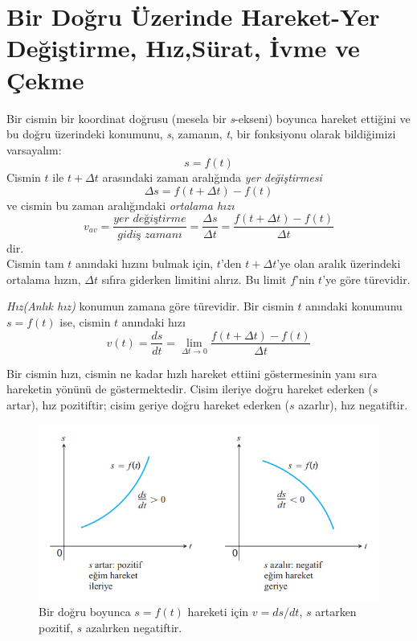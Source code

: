 \section{\protect Bir Doğru Üzerinde Hareket-Yer Değiştirme, Hız,Sürat, İvme ve Çekme} \label{bolumetiketi}
Bir cismin bir koordinat doğrusu (mesela bir \textit{s}-ekseni) boyunca hareket ettiğini ve bu doğru üzerindeki konumunu, \textit{s}, zamanın, \textit{t}, bir fonksiyonu olarak bildiğimizi varsayalım:
	\begin{equation*}
	s=f(t)
	\end{equation*}
Cismin $t$ ile $t+\varDelta t$ arasındaki zaman aralığında \textit{yer değiştirmesi}
	\begin{equation*}
	\varDelta s = f(t+ \varDelta t)-f(t)
	\end{equation*}
ve cismin bu zaman aralığındaki \textit{ortalama hızı}
	\begin{equation*}
	v_{av}=\frac{\textit{yer değiştirme}}{\textit{gidiş zamanı}}=\frac{\varDelta s}{\varDelta t}=\frac{f(t+ \varDelta t)- f(t)}{\varDelta t}
	\end{equation*}
dir.\\
Cismin tam $t$ anındaki hızını bulmak için, $t$'den $t+ \varDelta t$'ye olan aralık üzerindeki ortalama hızın, $\varDelta t$ sıfıra giderken limitini alırız. Bu limit $f$'nin $t$'ye göre türevidir.
\begin{tanim}
	\textit{Hız(Anlık hız)} konumun zamana göre türevidir. Bir cismin $t$ anındaki konumunu $s = f(t)$ ise, cismin $t$ anındaki hızı
	\begin{equation*}
	v(t)=\frac{ds}{dt}=\lim_{\varDelta t \rightarrow 0}\frac{f(t+ \varDelta t) - f(t)}{\varDelta t}
	\end{equation*}
\end{tanim}
Bir cismin hızı, cismin ne kadar hızlı hareket ettiini göstermesinin yanı sıra hareketin yönünü de göstermektedir. Cisim ileriye doğru hareket ederken ($s$ artar), hız pozitiftir; cisim geriye doğru hareket ederken ($s$ azarlır), hız negatiftir.
\begin{figure}[H]
	\centering
	\includegraphics[width=0.7\linewidth]{hizornek.png}
	\caption{Bir doğru boyunca $s=f(t)$ hareketi için $v=ds/dt$, $s$ artarken pozitif, $s$ azalırken negatiftir.}
	\label{fig:ornekresim}
\end{figure}
